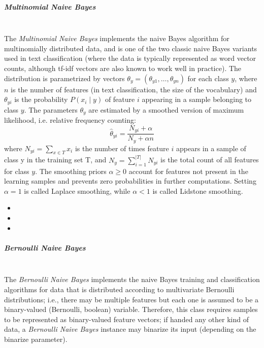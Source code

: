 \subparagraph{Multinomial Naive Bayes}
\mbox{}
\\The \textit{Multinomial Naive Bayes} implements the naive Bayes algorithm for
multinomially distributed data, and is one of the two classic naive Bayes
variants used in text classification (where the data is typically represented
as word vector counts, although tf-idf vectors are also known to work well in
practice).
%
The distribution is parametrized by vectors $\theta_y =
(\theta_{y1},\ldots,\theta_{yn})$ for each class $y$, where $n$ is the number of
features (in text classification, the size of the vocabulary) and $\theta_{yi}$
is the probability $P(x_i \mid y)$ of feature $i$ appearing in a sample
belonging to class $y$.
%
The parameters $\theta_y$ are estimated by a smoothed version of maximum
likelihood, i.e. relative frequency counting:
\begin{equation}
\hat{\theta}_{yi} = \frac{ N_{yi} + \alpha}{N_y + \alpha n}
\end{equation}
where $N_{yi} = \sum_{x \in T} x_i$ is the number of times feature $i$ appears
in a sample of class y in the training set T, and
$N_{y} = \sum_{i=1}^{|T|} N_{yi}$ is the total count of all features for class
$y$.
%
The smoothing priors $\alpha \ge 0$ account for features not present in the
learning samples and prevents zero probabilities in further computations.
%
Setting $\alpha = 1$ is called Laplace smoothing, while $\alpha < 1$ is called
Lidstone smoothing.
%
\begin{itemize}
  \item {}
  \item {}
  \item {}
\end{itemize}
\subparagraph{Bernoulli Naive Bayes}
\mbox{}
\\The \textit{Bernoulli Naive Bayes} implements the naive Bayes training and
classification algorithms for data that is distributed according to multivariate
Bernoulli distributions; i.e., there may be multiple features but each one is
assumed to be a binary-valued (Bernoulli, boolean) variable.
%
Therefore, this class requires samples to be represented as binary-valued
feature vectors; if handed any other kind of data, a \textit{Bernoulli Naive
Bayes} instance may binarize its input (depending on the binarize parameter).
